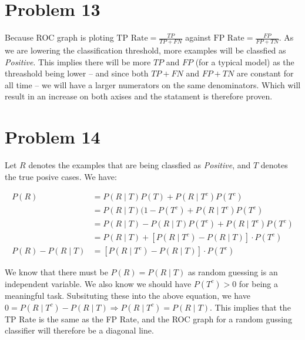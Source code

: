 \documentclass[12pt]{article}
\begin{document}
\section{Problem 13}

Because ROC graph is ploting $\text{TP Rate} = \frac{TP}{TP + FN}$ against $\text{FP Rate} = \frac{FP}{FP + TN}$. As we are lowering the classification threshold, more examples will be classfied as \textit{Positive}. This implies there will be more $TP$ and $FP$ (for a typical model) as the threashold being lower -- and since both $TP + FN$ and $FP + TN$ are constant for all time -- we will have a larger numerators on the same denominators. Which will result in an increase on both axises and the statament is therefore proven.

\section{Problem 14}

Let $R$ denotes the examples that are being classfied as \textit{Positive}, and $T$ denotes the true posive cases. We have:

\begin{align*}
    P(R) &= P(R \mid T)P(T) + P(R \mid T^c) P(T^c) \\
    &= P(R \mid T)(1 - P(T^c) + P(R \mid T^c) P(T^c) \\
    &= P(R \mid T) - P(R \mid T)P(T^c)+ P(R \mid T^c) P(T^c) \\
    &= P(R \mid T) + [P(R \mid T^c) -  P(R \mid T)] \cdot P(T^c) \\
    P(R) - P(R \mid T) &= [P(R \mid T^c) -  P(R \mid T)] \cdot P(T^c)
\end{align*}

We know that there must be $P(R) = P(R \mid T)$ as random guessing is an independent variable. We also know we should have $P(T^c) > 0$ for being a meaningful task. Subsituting these into the above equation, we have $0 = P(R \mid T^c) -  P(R \mid T) \Longrightarrow  P(R \mid T^c) = P(R \mid T)$. This implies that the TP Rate is the same as the FP Rate, and the ROC graph for a random gussing classifier will therefore be a diagonal line.


% 
% 
\end{document}
